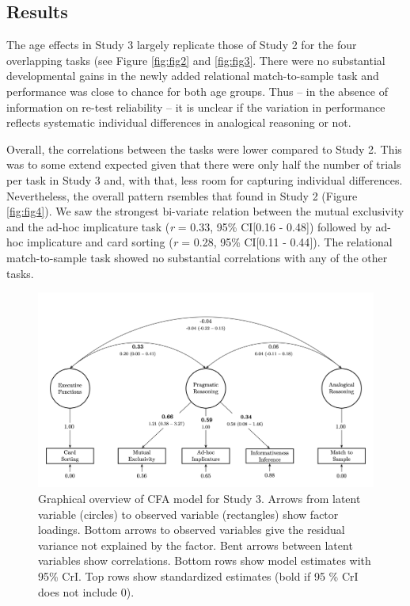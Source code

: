 \documentclass[
  english,
  man,floatsintext]{apa6}
\begin{document}
\hypertarget{results-2}{%
\subsection{Results}\label{results-2}}

The age effects in Study 3 largely replicate those of Study 2 for the four overlapping tasks (see Figure \ref{fig:fig2} and \ref{fig:fig3}. There were no substantial developmental gains in the newly added relational match-to-sample task and performance was close to chance for both age groups. Thus -- in the absence of information on re-test reliability -- it is unclear if the variation in performance reflects systematic individual differences in analogical reasoning or not.

Overall, the correlations between the tasks were lower compared to Study 2. This was to some extend expected given that there were only half the number of trials per task in Study 3 and, with that, less room for capturing individual differences. Nevertheless, the overall pattern rsembles that found in Study 2 (Figure \ref{fig:fig4}). We saw the strongest bi-variate relation between the mutual exclusivity and the ad-hoc implicature task (\emph{r} = 0.33, 95\% CI{[}0.16 - 0.48{]}) followed by ad-hoc implicature and card sorting (\emph{r} = 0.28, 95\% CI{[}0.11 - 0.44{]}). The relational match-to-sample task showed no substantial correlations with any of the other tasks.



\begin{figure}

{\centering \includegraphics[width=1\linewidth]{./figures/figure5} 

}

\caption{Graphical overview of CFA model for Study 3. Arrows from latent variable (circles) to observed variable (rectangles) show factor loadings. Bottom arrows to observed variables give the residual variance not explained by the factor. Bent arrows between latent variables show correlations. Bottom rows show model estimates with 95\% CrI. Top rows show standardized estimates (bold if 95 \% CrI does not include 0).}\label{fig:fig5}
\end{figure}
\end{document}
